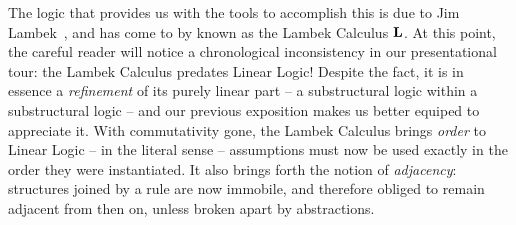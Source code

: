 The logic that provides us with the tools to accomplish this is due to Jim Lambek~\cite{lambek1958mathematics}, and has come to by known as the Lambek Calculus $\textbf{L}$.
At this point, the careful reader will notice a chronological inconsistency in our presentational tour: the Lambek Calculus predates Linear Logic! Despite the fact, it is in essence a \textit{refinement} of its purely linear part -- a substructural logic within a substructural logic -- and our previous exposition makes us better equiped to appreciate it.
With commutativity gone, the Lambek Calculus brings \textit{order} to Linear Logic -- in the literal sense -- assumptions must now be used exactly in the order they were instantiated.
It also brings forth the notion of \textit{adjacency}: structures joined by a rule are now immobile, and therefore obliged to remain adjacent from then on, unless broken apart by abstractions.

